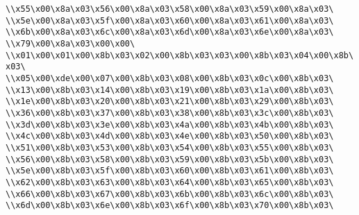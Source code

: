 \verb|\\x55\x00\x8a\x03\x56\x00\x8a\x03\x58\x00\x8a\x03\x59\x00\x8a\x03\|\newline
\verb|\\x5e\x00\x8a\x03\x5f\x00\x8a\x03\x60\x00\x8a\x03\x61\x00\x8a\x03\|\newline
\verb|\\x6b\x00\x8a\x03\x6c\x00\x8a\x03\x6d\x00\x8a\x03\x6e\x00\x8a\x03\|\newline
\verb|\\x79\x00\x8a\x03\x00\x00\|\newline
\verb|\\x01\x00\x01\x00\x8b\x03\x02\x00\x8b\x03\x03\x00\x8b\x03\x04\x00\x8b\x03\|\newline
\verb|\\x05\x00\xde\x00\x07\x00\x8b\x03\x08\x00\x8b\x03\x0c\x00\x8b\x03\|\newline
\verb|\\x13\x00\x8b\x03\x14\x00\x8b\x03\x19\x00\x8b\x03\x1a\x00\x8b\x03\|\newline
\verb|\\x1e\x00\x8b\x03\x20\x00\x8b\x03\x21\x00\x8b\x03\x29\x00\x8b\x03\|\newline
\verb|\\x36\x00\x8b\x03\x37\x00\x8b\x03\x38\x00\x8b\x03\x3c\x00\x8b\x03\|\newline
\verb|\\x3d\x00\x8b\x03\x3e\x00\x8b\x03\x4a\x00\x8b\x03\x4b\x00\x8b\x03\|\newline
\verb|\\x4c\x00\x8b\x03\x4d\x00\x8b\x03\x4e\x00\x8b\x03\x50\x00\x8b\x03\|\newline
\verb|\\x51\x00\x8b\x03\x53\x00\x8b\x03\x54\x00\x8b\x03\x55\x00\x8b\x03\|\newline
\verb|\\x56\x00\x8b\x03\x58\x00\x8b\x03\x59\x00\x8b\x03\x5b\x00\x8b\x03\|\newline
\verb|\\x5e\x00\x8b\x03\x5f\x00\x8b\x03\x60\x00\x8b\x03\x61\x00\x8b\x03\|\newline
\verb|\\x62\x00\x8b\x03\x63\x00\x8b\x03\x64\x00\x8b\x03\x65\x00\x8b\x03\|\newline
\verb|\\x66\x00\x8b\x03\x67\x00\x8b\x03\x6b\x00\x8b\x03\x6c\x00\x8b\x03\|\newline
\verb|\\x6d\x00\x8b\x03\x6e\x00\x8b\x03\x6f\x00\x8b\x03\x70\x00\x8b\x03\|\newline
